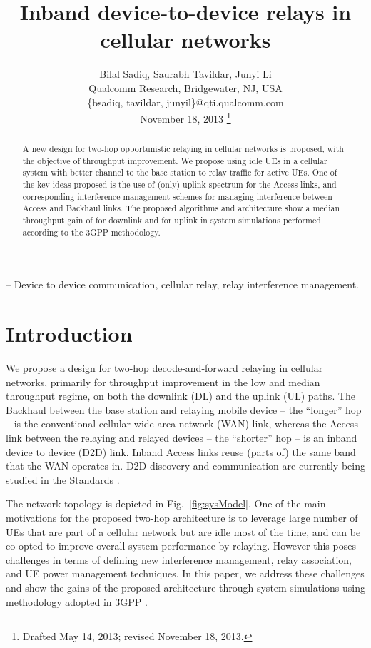\documentclass[journal]{IEEEtran}
\begin{document}
\title{Inband device-to-device relays in cellular networks}

\author{Bilal Sadiq, Saurabh Tavildar, Junyi Li\\
        Qualcomm Research, Bridgewater, NJ, USA\\
        \{bsadiq, tavildar, junyil\}@qti.qualcomm.com\\
        \vspace{0.15in}
        November 18, 2013
\thanks{Drafted May 14, 2013; revised November 18, 2013.}}
\maketitle

\begin{abstract}
	A new design for two-hop opportunistic relaying in cellular networks is proposed, with the objective of throughput improvement. We propose using idle UEs in a cellular system with better channel to the base station to relay traffic for active UEs. One of the key ideas proposed is the use of (only) uplink spectrum for the Access links, and corresponding interference management schemes for managing interference between Access and Backhaul links. The proposed algorithms and architecture show a median throughput gain of  for downlink and  for uplink in system simulations performed according to the 3GPP methodology.
\end{abstract}

 -- Device to device communication, cellular relay, relay interference management.

\section{Introduction}
\label{sec:intro}
We propose a design for two-hop decode-and-forward relaying in cellular networks, primarily for throughput improvement in the low and median throughput regime, on both the downlink (DL) and the uplink (UL) paths.   The Backhaul between the base station and relaying mobile device -- the ``longer'' hop -- is the conventional cellular wide area network (WAN) link, whereas the Access link between the relaying and relayed devices -- the ``shorter'' hop -- is an inband device to device (D2D) link. Inband Access links reuse (parts of) the same band that the WAN operates in. D2D discovery and communication are currently being studied in the Standards \cite{3GPP22803}.

The network topology is depicted in Fig.~\ref{fig:sysModel}.  One of the main motivations for the proposed two-hop architecture is to leverage large number of UEs that are part of a cellular network but are idle most of the time, and can be co-opted to improve overall system performance by relaying. However this poses challenges in terms of defining new interference management, relay association, and UE power management techniques.  In this paper, we address these challenges and show the gains of the proposed architecture through system simulations using methodology adopted in 3GPP \cite{3GPP36814}.
\end{document}
